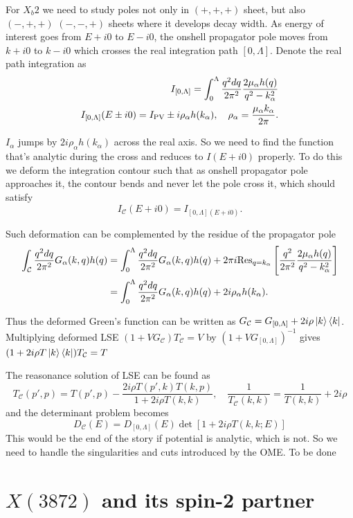 \documentclass[aps,prl,showpacs,amsmath,onecolumn,superscriptaddress,floatfix,nofootinbib,notitlepage]{revtex4-2}
\newcommand{\be}{\begin{equation}}
\newcommand{\ee}{\end{equation}}
\newcommand{\B}{\color{blue}}
\newcommand{\X}{X(3872)}
\begin{document}
For $X_b2$ we need to study poles not only in $(+,+,+)$ sheet, but also $(-,+,+)$ $(-,-,+)$ sheets where it develops decay width. As energy of interest goes from $E+i0$ to $E-i0$, the onshell propagator pole moves from $k + i0$ to $k-i0$ which crosses the real integration path $[0,\Lambda]$. Denote the real path integration as
\be
\begin{aligned}
	I_{[0,\Lambda]} = \int_0^\Lambda \frac{q^2dq}{2\pi^2}\frac{2\mu_\alpha h(q)}{q^2-k_\alpha^2} \\
	I_{[0,\Lambda]}(E\pm i0) = I_{\rm PV} \pm i \rho_\alpha h(k_\alpha),\quad \rho_\alpha = \frac{\mu_\alpha k_\alpha}{2\pi}.
\end{aligned}
\ee

$I_\alpha$ jumps by $2i\rho_\alpha h(k_\alpha)$ across the real axis. So we need to find the function that's analytic during the cross and reduces to $I(E+i0)$ properly.
To do this we deform the integration contour such that as onshell propagator pole approaches it, the contour bends and never let the pole cross it, which should satisfy
\be
I_\mathcal{C}(E+i0) = I_{[0,\Lambda](E+i0)}.
\ee

Such deformation can be complemented by the residue of the propagator pole
\be
\begin{aligned}
	\int_\mathcal C \frac{q^2dq}{2\pi^2}G_\alpha (k,q)h(q) & = \int_0^\Lambda \frac{q^2dq}{2\pi^2}G_\alpha(k,q)h(q) + 2\pi i {\rm Res}_{q=k_\alpha}\left[\frac{q^2}{2\pi^2}\frac{2\mu_\alpha h(q)}{q^2-k_\alpha^2}\right] \\
	                                                       & =\int_0^\Lambda \frac{q^2dq}{2\pi^2}G_\alpha(k,q)h(q) + 2i\rho_\alpha h(k_\alpha).
\end{aligned}
\ee

Thus the deformed Green's function can be written as $G_\mathcal C = G_{[0,\Lambda]} + 2i\rho\ket{k}\bra{k}$. Multiplying deformed LSE $(1+VG_\mathcal C)T_\mathcal C = V$ by $(1 + VG_{[0,\Lambda]})^{-1}$ gives $(1 + 2i\rho T\ket{k}\bra{k})T_\mathcal C = T $

The reasonance solution of LSE can be found as
\be
T_\mathcal C (p',p) = T(p',p) - \frac{2i\rho T(p',k)T(k,p)}{1 + 2i\rho T(k,k)},\quad \frac{1}{T_\mathcal C (k,k)} = \frac{1}{T(k,k)} + 2i\rho
\ee
and the determinant problem becomes
\be
D_\mathcal C (E) = D_{[0,\Lambda]}(E)\det\left[1 + 2i\rho T(k,k;E)\right]
\ee
This would be the end of the story if potential is analytic, which is not. So we need to handle the singularities and cuts introduced by the OME. {\B To be done}
\section{$\X$ and its spin-2 partner}
\end{document}
